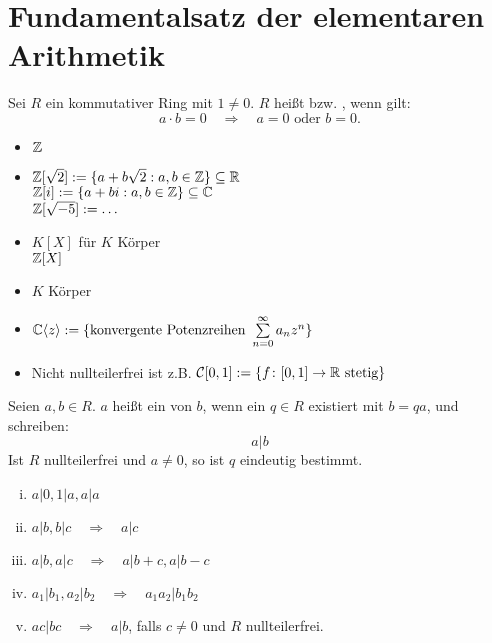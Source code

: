\section{Fundamentalsatz der elementaren Arithmetik}
\label{sec:para1}

	Sei $R$ ein kommutativer Ring mit $1 \neq 0$. $R$ heißt  bzw. , wenn gilt: 
	\[ a \cdot b = 0 \quad \Rightarrow \quad a = 0 \text{ oder } b = 0.\]

\begin{bsp} \label{bsp_integritaetsringe}
	\begin{itemize}
		\item $\mathbb{Z}$
		\item $\mathbb{Z}[\sqrt{2}] := \{a + b\sqrt{2} : a,b \in \mathbb{Z} \} \subseteq \mathbb{R}$ \\
			$\mathbb{Z}[i] := \{a + bi : a,b \in \mathbb{Z}\} \subseteq \mathbb{C}$ \\
			$\mathbb{Z}[\sqrt{-5}] := \dots$
		\item $K[X]$ für $K$ Körper \\
			$\mathbb{Z}[X]$
		\item $K$ Körper
		\item $\mathbb{C} \langle z\rangle := \{\text{konvergente Potenzreihen } \sum\limits_{n=0}^{\infty} a_n z^n\}$
		\item Nicht nullteilerfrei ist z.B. $\mathcal{C}[0,1] := \{f \colon [0,1] \rightarrow \mathbb{R} \text{ stetig} \}$
	\end{itemize}
\end{bsp}

\begin{defn}[Teilbarkeit] \label{def_1.1}
	Seien $a,b \in R$. $a$ heißt ein  von $b$, wenn ein $q \in R$ existiert mit $b = qa$, und schreiben:
	\[ a | b \]
	Ist $R$ nullteilerfrei und $a \neq 0$, so ist $q$ eindeutig bestimmt.
\end{defn}

\begin{falko} \label{F1.1}
	\begin{enumerate}[(i)]
		\item $a | 0, 1 | a, a | a$
		\item $a | b, b | c \quad \Rightarrow \quad a | c$
		\item $a | b, a | c \quad \Rightarrow \quad a | b+c, a | b-c$
		\item $a_1 | b_1, a_2 | b_2 \quad \Rightarrow \quad a_1 a_2 | b_1 b_2$
		\item $ac | bc \quad \Rightarrow \quad a | b$, falls $c \neq 0$ und $R$ nullteilerfrei.
	\end{enumerate}	
\end{falko}

